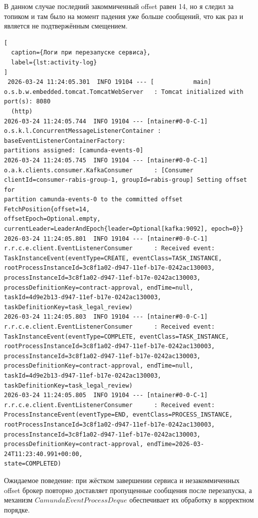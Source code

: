                                                                         
В данном случае последний закоммиченный offset равен 14, но я следил за топиком и там было на момент падения уже больше сообщений, что как раз и является не подтвержённым смещением.                                
                
\begin{lstlisting}[
  caption={Логи при перезапуске сервиса},
  label={lst:activity-log}
]
 2026-03-24 11:24:05.301  INFO 19104 --- [           main]
o.s.b.w.embedded.tomcat.TomcatWebServer   : Tomcat initialized with port(s): 8080
  (http)
2026-03-24 11:24:05.744  INFO 19104 --- [ntainer#0-0-C-1]
o.s.k.l.ConcurrentMessageListenerContainer : baseEventListenerContainerFactory:
partitions assigned: [camunda-events-0]
2026-03-24 11:24:05.745  INFO 19104 --- [ntainer#0-0-C-1]
o.a.k.clients.consumer.KafkaConsumer      : [Consumer
clientId=consumer-rabis-group-1, groupId=rabis-group] Setting offset for
partition camunda-events-0 to the committed offset FetchPosition{offset=14,
offsetEpoch=Optional.empty,
currentLeader=LeaderAndEpoch{leader=Optional[kafka:9092], epoch=0}}
2026-03-24 11:24:05.801  INFO 19104 --- [ntainer#0-0-C-1]
r.r.c.e.client.EventListenerConsumer      : Received event:
TaskInstanceEvent(eventType=CREATE, eventClass=TASK_INSTANCE,
rootProcessInstanceId=3c8f1a02-d947-11ef-b17e-0242ac130003,
processInstanceId=3c8f1a02-d947-11ef-b17e-0242ac130003,
processDefinitionKey=contract-approval, endTime=null,
taskId=4d9e2b13-d947-11ef-b17e-0242ac130003, taskDefinitionKey=task_legal_review)
2026-03-24 11:24:05.803  INFO 19104 --- [ntainer#0-0-C-1]
r.r.c.e.client.EventListenerConsumer      : Received event:
TaskInstanceEvent(eventType=COMPLETE, eventClass=TASK_INSTANCE,
rootProcessInstanceId=3c8f1a02-d947-11ef-b17e-0242ac130003,
processInstanceId=3c8f1a02-d947-11ef-b17e-0242ac130003,
processDefinitionKey=contract-approval, endTime=null,
taskId=4d9e2b13-d947-11ef-b17e-0242ac130003, taskDefinitionKey=task_legal_review)
2026-03-24 11:24:05.805  INFO 19104 --- [ntainer#0-0-C-1]
r.r.c.e.client.EventListenerConsumer      : Received event:
ProcessInstanceEvent(eventType=END, eventClass=PROCESS_INSTANCE,
rootProcessInstanceId=3c8f1a02-d947-11ef-b17e-0242ac130003,
processInstanceId=3c8f1a02-d947-11ef-b17e-0242ac130003,
processDefinitionKey=contract-approval, endTime=2026-03-24T11:23:40.991+00:00,
state=COMPLETED)
\end{lstlisting}
                                                                  
Ожидаемое поведение: при жёстком завершении     
сервиса и незакоммиченных offset брокер повторно доставляет          
пропущенные сообщения после перезапуска, а механизм                    
$CamundaEventProcessDeque$ обеспечивает их обработку в корректном
порядке.

